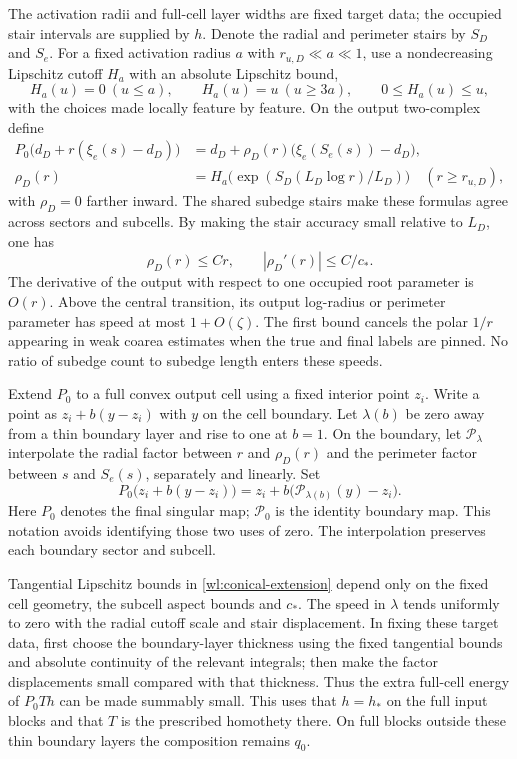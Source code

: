 The activation radii and full-cell layer widths are fixed target
data; the occupied stair intervals are supplied by $h$.  Denote the
radial and perimeter stairs by $S_D$ and $S_e$.  For a fixed activation
radius $a$ with $r_{u,D}\ll a\ll1$, use a nondecreasing Lipschitz
cutoff $H_a$ with an absolute Lipschitz bound,
\[
 H_a(u)=0\ (u\leq a),\qquad H_a(u)=u\ (u\geq3a),\qquad
 0\leq H_a(u)\leq u,
\]
with the choices made locally feature by feature.  On the output
two-complex define
\begin{align}
 P_0\bigl(d_D+r(\xi_e(s)-d_D)\bigr)
   &=d_D+\rho_D(r)\bigl(\xi_e(S_e(s))-d_D\bigr),
       \label{wl:target-map}\\
 \rho_D(r)&=H_a\bigl(\exp(S_D(L_D\log r)/L_D)\bigr)
       \quad(r\geq r_{u,D}),\label{wl:radial-stair}
\end{align}
with $\rho_D=0$ farther inward.  The shared subedge stairs make these
formulas agree across sectors and subcells.  By making the stair
accuracy small relative to $L_D$, one has
\begin{equation}\label{wl:target-speeds}
 \rho_D(r)\leq Cr,\qquad |\rho_D'(r)|\leq C/c_*.
\end{equation}
The derivative of the output with respect to one occupied root
parameter is $O(r)$.  Above the central transition, its output
log-radius or perimeter parameter has speed at most $1+O(\zeta)$.
The first bound cancels the polar $1/r$ appearing in weak coarea
estimates when the true and final labels are pinned.  No ratio of
subedge count to subedge length enters these speeds.

Extend $P_0$ to a full convex output cell using a fixed interior point
$z_i$.  Write a point as $z_i+b(y-z_i)$ with $y$ on the cell boundary.
Let $\lambda(b)$ be zero away from a thin boundary layer and rise to
one at $b=1$.  On the boundary, let $\mathcal P_\lambda$ interpolate
the radial factor between $r$ and $\rho_D(r)$ and the perimeter
factor between $s$ and $S_e(s)$, separately and linearly.  Set
\begin{equation}\label{wl:conical-extension}
 P_0\bigl(z_i+b(y-z_i)\bigr)
   =z_i+b\bigl(\mathcal P_{\lambda(b)}(y)-z_i\bigr).
\end{equation}
Here $P_0$ denotes the final singular map; $\mathcal P_0$ is the
identity boundary map.  This notation avoids identifying those two
uses of zero.  The interpolation preserves each boundary sector and
subcell.

Tangential Lipschitz bounds in \eqref{wl:conical-extension} depend only
on the fixed cell geometry, the subcell aspect bounds and $c_*$.  The
speed in $\lambda$ tends uniformly to zero with the radial cutoff
scale and stair displacement.  In fixing these target data, first choose the boundary-layer
thickness using the fixed tangential bounds and absolute continuity
of the relevant integrals; then make the factor displacements small
compared with that thickness.  Thus the extra full-cell energy of
$P_0Th$ can be made summably small.  This uses that $h=h_*$ on the
full input blocks and that $T$ is the prescribed homothety there.
On full blocks outside these thin boundary layers the composition
remains $q_0$.

